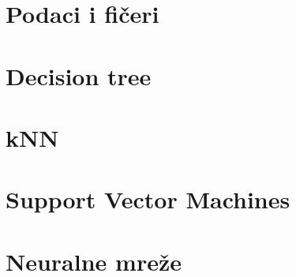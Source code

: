 \section{Podaci i fi\v ceri}

\section{Decision tree}

\section{kNN}

\section{Support Vector Machines}

\section{Neuralne mre\v ze}